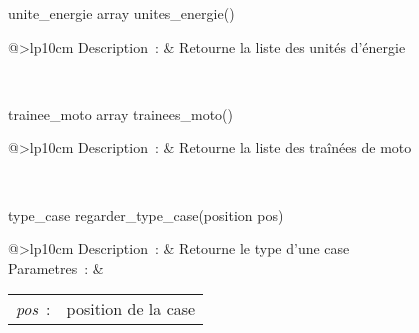 \begin{minipage}{\linewidth}

\begin{lst-c++}
unite_energie array unites_energie()
\end{lst-c++}

\noindent
\begin{tabular}[t]{@{\extracolsep{0pt}}>{\bfseries}lp{10cm}}
Description~: & Retourne la liste des unités d'énergie \\







\end{tabular} \\[0.3cm]
\end{minipage}


\begin{minipage}{\linewidth}

\begin{lst-c++}
trainee_moto array trainees_moto()
\end{lst-c++}

\noindent
\begin{tabular}[t]{@{\extracolsep{0pt}}>{\bfseries}lp{10cm}}
Description~: & Retourne la liste des traînées de moto \\







\end{tabular} \\[0.3cm]
\end{minipage}


\begin{minipage}{\linewidth}

\begin{lst-c++}
type_case regarder_type_case(position pos)
\end{lst-c++}

\noindent
\begin{tabular}[t]{@{\extracolsep{0pt}}>{\bfseries}lp{10cm}}
Description~: & Retourne le type d'une case \\


Parametres~: &
\begin{tabular}[t]{@{\extracolsep{0pt}}ll}
    
    
      
        \textsl{pos}~: & position de la case \\
      
    
  \end{tabular} \\






\end{tabular} \\[0.3cm]
\end{minipage}


